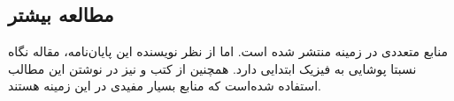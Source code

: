 \begin{figure}
	\centering
	\caption{}
	\label{fig:concept-of-phase-encoding}
\end{figure}










\subsection{مطالعه بیشتر}
منابع متعددی در زمینه \mri منتشر شده است. اما از نظر نویسنده این پایان‌نامه، مقاله \cite{McRobbie} نگاه نسبتا پوشایی به فیزیک ابتدایی \mri دارد. همچنین از کتب \cite{book:basic-principles-and-applications} و \cite{book:MRIfromPictureToProton} نیز در نوشتن این مطالب استفاده شده‌است که منابع بسیار مفیدی در این زمینه هستند.

